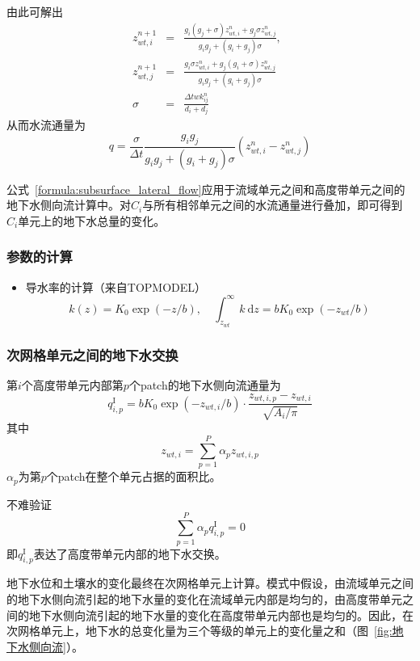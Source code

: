 由此可解出
\begin{eqnarray}
z_{wt,i}^{n+1} &=& \frac{g_i\left(g_j+\sigma\right)z_{wt,i}^{n} +g_j\sigma z_{wt,j}^{n}}{g_ig_j+\left(g_i+g_j\right)\sigma},\\
z_{wt,j}^{n+1} &=& \frac{g_i\sigma z_{wt,i}^{n} +g_j\left(g_i+\sigma\right)z_{wt,j}^{n}}{g_ig_j+\left(g_i+g_j\right)\sigma}\quad \\
\sigma &=& \frac{\Delta t wk_{ij}^n}{d_i+d_j}
\end{eqnarray}
从而水流通量为
\begin{equation}\label{formula:subsurface_lateral_flow}
q = \frac{\sigma}{\Delta t} \frac{g_ig_j}{g_ig_j+\left(g_i+g_j\right)\sigma} \left( z_{wt,i}^{n} - z_{wt,j}^{n} \right)
\end{equation}

公式~\eqref{formula:subsurface_lateral_flow}应用于流域单元之间和高度带单元之间的地下水侧向流计算中。对$C_i$与所有相邻单元之间的水流通量进行叠加，即可得到$C_i$单元上的地下水总量的变化。

\subsubsection{参数的计算}
\begin{itemize}
\item 导水率的计算（来自TOPMODEL）
\begin{equation}
k(z) = K_0\exp{(- z/b)},\quad \int^\infty_{z_{wt}} k\ \mathrm{d}z = b K_0\exp{(-z_{wt}/b)}
\end{equation}
\end{itemize}

\subsubsection{次网格单元之间的地下水交换}
第$i$个高度带单元内部第$p$个patch的地下水侧向流通量为
\begin{equation}
q^{\mathrm{I}}_{i,p} = b K_0 \exp{(-z_{wt,i}/b)}\cdot\frac{z_{wt,i,p}-z_{wt,i}}{\sqrt{A_i/\pi}}
\end{equation}
其中
$$z_{wt,i} = \sum^P_{p=1} \alpha_p z_{wt,i,p}$$
$\alpha_p$为第$p$个patch在整个单元占据的面积比。

不难验证
$$\sum^P_{p=1} \alpha_p q^{\mathrm{I}}_{i,p} =0$$
即$q^{\mathrm{I}}_{i,p}$表达了高度带单元内部的地下水交换。

地下水位和土壤水的变化最终在次网格单元上计算。模式中假设，由流域单元之间的地下水侧向流引起的地下水量的变化在流域单元内部是均匀的，由高度带单元之间的地下水侧向流引起的地下水量的变化在高度带单元内部也是均匀的。因此，在次网格单元上，地下水的总变化量为三个等级的单元上的变化量之和（图~\ref{fig:地下水侧向流}）。

